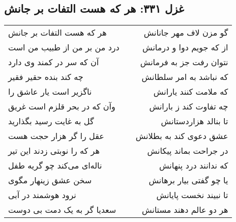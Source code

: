 \begin{center}
\section*{غزل ۳۳۱: هر که هست التفات بر جانش}
\label{sec:331}
\begin{longtable}{l p{0.5cm} r}
هر که هست التفات بر جانش
&&
گو مزن لاف مهر جانانش
\\
درد من بر من از طبیب من است
&&
از که جویم دوا و درمانش
\\
آن که سر در کمند وی دارد
&&
نتوان رفت جز به فرمانش
\\
چه کند بنده حقیر فقیر
&&
که نباشد به امر سلطانش
\\
ناگزیر است یار عاشق را
&&
که ملامت کنند یارانش
\\
وآن که در بحر قلزم است غریق
&&
چه تفاوت کند ز بارانش
\\
گل به غایت رسید بگذارید
&&
تا بنالد هزاردستانش
\\
عقل را گر هزار حجت هست
&&
عشق دعوی کند به بطلانش
\\
هر که را نوبتی زدند این تیر
&&
در جراحت بماند پیکانش
\\
ناله‌ای می‌کند چو گریه طفل
&&
که ندانند درد پنهانش
\\
سخن عشق زینهار مگوی
&&
یا چو گفتی بیار برهانش
\\
نرود هوشمند در آبی
&&
تا نبیند نخست پایانش
\\
سعدیا گر به یک دمت بی دوست
&&
هر دو عالم دهند مستانش
\\
\end{longtable}
\end{center}
